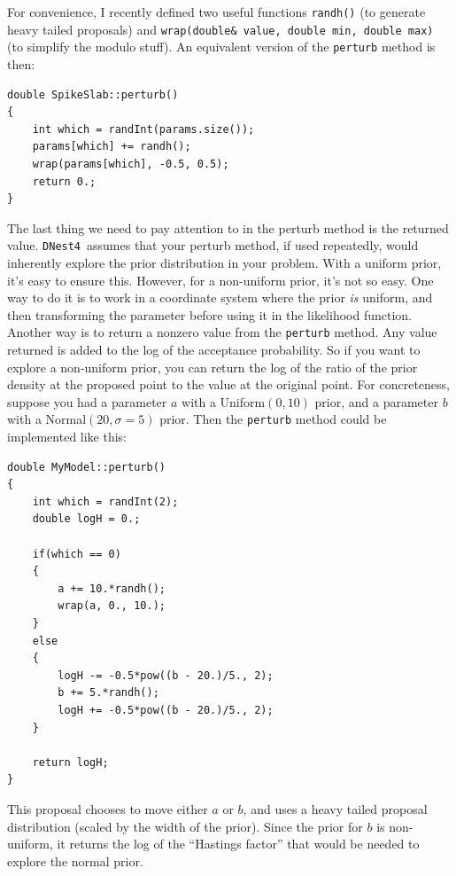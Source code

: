 \documentclass[a4paper, 11pt]{article}
\newcommand{\dnest}{{\tt DNest4}}
\begin{document}
For convenience, I recently defined two useful functions {\tt randh()}
(to generate heavy tailed proposals) and
{\tt wrap(double\& value, double min, double max)} (to simplify the modulo
stuff). An equivalent version of the {\tt perturb} method is then:\\

\begin{framed}
\begin{verbatim}
double SpikeSlab::perturb()
{
    int which = randInt(params.size());
    params[which] += randh();
    wrap(params[which], -0.5, 0.5);
    return 0.;
}
\end{verbatim}
\end{framed}

The last thing we need to pay attention to in the perturb method is the
returned value. \dnest~assumes that your perturb method, if used repeatedly,
would inherently explore the prior distribution in your problem. With
a uniform prior, it's easy to ensure this. However, for a non-uniform prior,
it's not so easy. One way to do it is to work in a coordinate system where
the prior {\it is} uniform, and then transforming the parameter before using
it in the likelihood function. Another way is to return a nonzero value from
the {\tt perturb} method. Any value returned is added to the log of the
acceptance probability. So if you want to explore a non-uniform prior, you
can return the log of the ratio of the prior density at the proposed point
to the value at the original point. For concreteness, suppose you had a
parameter $a$ with a Uniform$(0,10)$ prior, and a parameter $b$ with a
Normal$(20, \sigma=5)$ prior. Then the {\tt perturb} method could be implemented
like this:\newpage

\begin{framed}
\begin{verbatim}
double MyModel::perturb()
{
    int which = randInt(2);
    double logH = 0.;

    if(which == 0)
    {
        a += 10.*randh();
        wrap(a, 0., 10.);
    }
    else
    {
        logH -= -0.5*pow((b - 20.)/5., 2);
        b += 5.*randh();
        logH += -0.5*pow((b - 20.)/5., 2);
    }

    return logH;
}
\end{verbatim}
\end{framed}

This proposal chooses to move either $a$ or $b$, and uses a heavy tailed
proposal distribution (scaled by the width of the prior). Since the prior for
$b$ is non-uniform, it returns the log of the ``Hastings factor'' that would
be needed to explore the normal prior.\\
\end{document}
